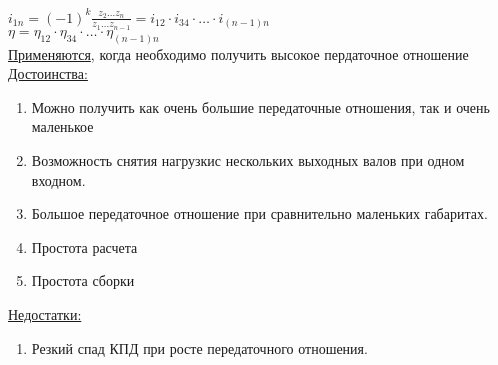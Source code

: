 \documentclass{article}
\begin{document}
$i_{1n} = (-1)^k \frac{z_2 \dots z_n}{z_1 \dots z_{n-1}} = i_{12} \cdot i_{34} \cdot \dots \cdot i_{(n-1)n}$\\
$\eta = \eta_{12} \cdot \eta_{34} \cdot \dots \cdot \eta_{(n-1)n}$\\
\underline{Применяются}, когда необходимо получить высокое пердаточное отношение
\underline{Достоинства:}
\begin{enumerate}
	\item Можно получить как очень большие передаточные отношения, так и очень маленькое
	\item Возможность снятия нагрузкис нескольких выходных валов при одном входном.
	\item Большое передаточное отношение при сравнительно маленьких габаритах.
	\item Простота расчета
	\item Простота сборки
\end{enumerate}
\underline{Недостатки:} 
\begin{enumerate}
	\item Резкий спад КПД при росте передаточного отношения.
\end{enumerate}
\end{document}
